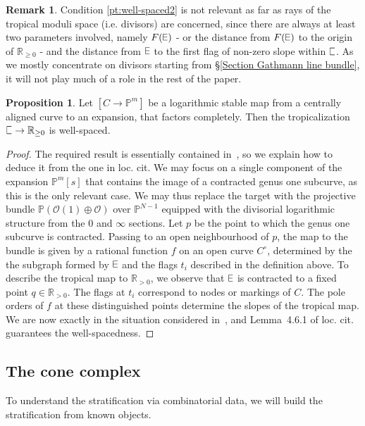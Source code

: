 \documentclass[11pt]{amsart}
\DeclareRobustCommand{\plE}{\text{\reflectbox{$\exists$}}}
\newcommand{\plC}{\scalebox{0.8}[1.3]{$\sqsubset$}}
\renewcommand{\to}{\rightarrow}
\newcommand{\RR}{\mathbb{R}}
\theoremstyle{definition}
\newtheorem{prop}[thm]{Proposition}
\theoremstyle{definition}
\newtheorem*{rem}{Remark}
\begin{document}
\begin{rem}
Condition \eqref{pt:well-spaced2} is not relevant as far as rays of the tropical moduli space (i.e. divisors) are concerned, since there are always at least two parameters involved, namely $F(\plE)$ - or the distance from $F(\plE)$ to the origin of $\RR_{\geq 0}$ - and the distance from $\plE$ to the first flag of non-zero slope within $\plC$. As we mostly concentrate on divisors starting from \S \ref{Section Gathmann line bundle}, it will not play much of a role in the rest of the paper.
\end{rem}

\begin{prop}\label{prop: well-spaced}
Let $[C\to \mathbb P^m]$ be a logarithmic stable map from a centrally aligned curve to an expansion, that factors completely. Then the tropicalization $\plC\to \mathbb R_{\geq 0}$ is well-spaced.
\end{prop}

\begin{proof}
The required result is essentially contained in~\cite[Section 4]{RSPW2}, so we explain how to deduce it from the one in loc. cit. We may focus on a single component of the expansion $\mathbb P^m[s]$ that contains the image of a contracted genus one subcurve, as this is the only relevant case. We may thus replace the target with the projective bundle $\mathbb P(\mathcal O(1)\oplus \mathcal O)$ over $\mathbb P^{N-1}$ equipped with the divisorial logarithmic structure from the $0$ and $\infty$ sections. Let $p$ be the point to which the genus one subcurve is contracted. Passing to an open neighbourhood of $p$, the map to the bundle is given by a rational function $f$ on an open curve $C^\circ$, determined by the the subgraph formed by $\plE$ and the flags $t_i$ described in the definition above. To describe the tropical map to $\mathbb R_{>0}$, we observe that $\plE$ is contracted to a fixed point $q\in\mathbb R_{>0}$. The flags at $t_i$ correspond to nodes or markings of $C$. The pole orders of $f$ at these distinguished points determine the slopes of the tropical map. We are now exactly in the situation considered in~\cite[Second Paragraph of \S~4.6]{RSPW2}, and Lemma~4.6.1 of loc. cit. guarantees the well-spacedness.
\end{proof}

\subsection{The cone complex} To understand the stratification via combinatorial data, we will build the stratification from known objects. \\
\end{document}
